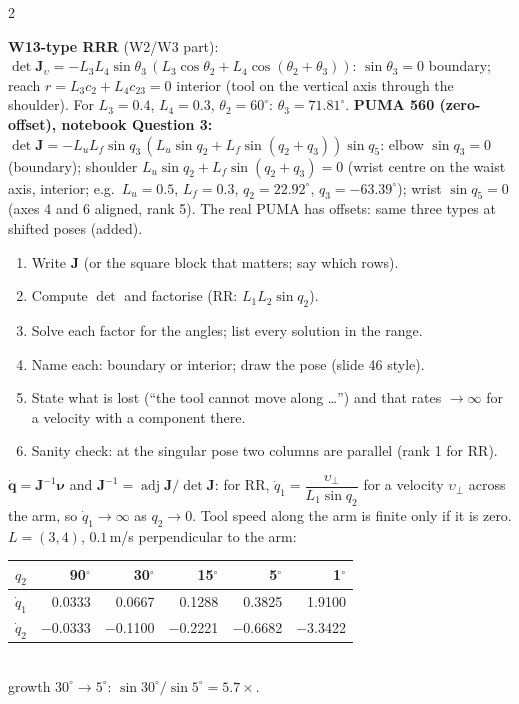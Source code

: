 \begin{multicols}{2}
\begin{worked}[planar RR $L=(3,4)$, $q_1=30^\circ$ at the two singular poses (notebook cell 46)]
\end{worked}
\begin{worked}
\textbf{W13-type RRR} (W2/W3 part): $\det\mathbf J_\upsilon=-L_3L_4\sin\theta_3\,(L_3\cos\theta_2+L_4\cos(\theta_2+\theta_3))$: $\sin\theta_3=0$ boundary; reach $r=L_3c_2+L_4c_{23}=0$ interior (tool on the vertical axis through the shoulder). For $L_3=0.4$, $L_4=0.3$, $\theta_2=60^\circ$: $\theta_3=71.81^\circ$. \textbf{PUMA 560 (zero-offset), notebook Question 3:} $\det\mathbf J=-L_uL_f\sin q_3\,(L_u\sin q_2+L_f\sin(q_2+q_3))\sin q_5$: elbow $\sin q_3=0$ (boundary); shoulder $L_u\sin q_2+L_f\sin(q_2+q_3)=0$ (wrist centre on the waist axis, interior; e.g.\ $L_u=0.5$, $L_f=0.3$, $q_2=22.92^\circ$, $q_3=-63.39^\circ$); wrist $\sin q_5=0$ (axes 4 and 6 aligned, rank 5). The real PUMA has offsets: same three types at shifted poses (added). \chk
\end{worked}
\begin{recipe}
\begin{enumerate}
\item Write $\mathbf J$ (or the square block that matters; say which rows).
\item Compute $\det$ and factorise (RR: $L_1L_2\sin q_2$).
\item Solve each factor for the angles; list every solution in the range.
\item Name each: boundary or interior; draw the pose (slide 46 style).
\item State what is lost (``the tool cannot move along \ldots'') and that rates $\to\infty$ for a velocity with a component there.
\item Sanity check: at the singular pose two columns are parallel (rank 1 for RR).
\end{enumerate}
\end{recipe}
\begin{fbx}[Why rates blow up near $\det\mathbf J=0$ \added]
$\dot{\mathbf q}=\mathbf J^{-1}\boldsymbol\nu$ and $\mathbf J^{-1}=\operatorname{adj}\mathbf J/\det\mathbf J$: for RR, $\dot q_1=\dfrac{\upsilon_\perp}{L_1\sin q_2}$ for a velocity $\upsilon_\perp$ across the arm, so $\dot q_1\to\infty$ as $q_2\to0$. Tool speed along the arm is finite only if it is zero. $L=(3,4)$, $0.1$\,m/s perpendicular to the arm:
\begin{tabular}{@{}lrrrrr@{}}\toprule $q_2$&90$^\circ$&30$^\circ$&15$^\circ$&5$^\circ$&1$^\circ$\\\midrule
$\dot q_1$&0.0333&0.0667&0.1288&0.3825&1.9100\\$\dot q_2$&$-$0.0333&$-$0.1100&$-$0.2221&$-$0.6682&$-$3.3422\\\bottomrule\end{tabular}\\
growth $30^\circ\to5^\circ$: $\sin30^\circ/\sin5^\circ=5.7\times$. \chk
\end{fbx}


\end{multicols}

